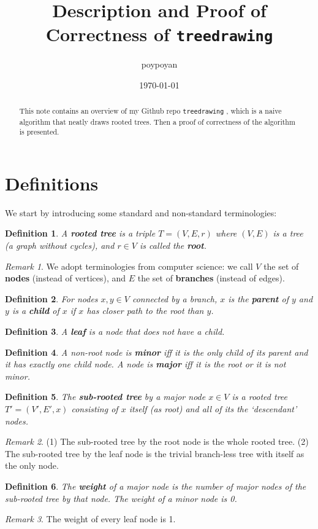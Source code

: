 \documentclass{article}
\title{Description and Proof of Correctness of \texttt{treedrawing}}
\author{poypoyan}
\date{\petsa\today}
\theoremstyle{plain}
\newtheorem{definition}{Definition}[section]
\theoremstyle{remark}
\newtheorem*{remark}{Remark}
\begin{document}
\maketitle

\begin{abstract}
This note contains an overview of my Github repo \texttt{treedrawing} \cite{treedrawing}, which is a naive algorithm that neatly draws rooted trees. Then a proof of correctness of the algorithm is presented.
\end{abstract}

\section{Definitions}
We start by introducing some standard and non-standard terminologies:
\begin{definition}
A \textbf{rooted tree} is a triple $T=(V, E, r)$ where $(V, E)$ is a tree (a graph without cycles), and $r \in V$ is called the \textbf{root}.
\end{definition}
\begin{remark}
We adopt terminologies from computer science: we call $V$ the set of \textbf{nodes} (instead of vertices), and $E$ the set of \textbf{branches} (instead of edges).
\end{remark}
\begin{definition}
For nodes $x, y \in V$ connected by a branch, $x$ is the \textbf{parent} of $y$ and $y$ is a \textbf{child} of $x$ if $x$ has closer path to the root than $y$. 
\end{definition}
\begin{definition}
A \textbf{leaf} is a node that does not have a child.
\end{definition}
\begin{definition}
A non-root node is \textbf{minor} iff it is the only child of its parent and it has exactly one child node. A node is \textbf{major} iff it is the root or it is not minor. 
\end{definition}
\begin{definition}
The \textbf{sub-rooted tree} by a major node $x \in V$ is a rooted tree $T'=(V', E', x)$ consisting of $x$ itself (as root) and all of its the `descendant' nodes.
\end{definition}
\begin{remark}
(1) The sub-rooted tree by the root node is the whole rooted tree. (2) The sub-rooted tree by the leaf node is the trivial branch-less tree with itself as the only node.
\end{remark}
\begin{definition}\label{weight}
The \textbf{weight} of a major node is the number of major nodes of the sub-rooted tree by that node. The weight of a minor node is 0.
\end{definition}
\begin{remark}
The weight of every leaf node is 1.
\end{remark}
\end{document}
